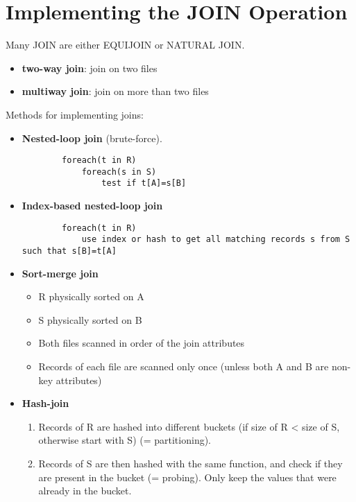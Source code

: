 \section{Implementing the JOIN Operation}
Many JOIN are either EQUIJOIN or NATURAL JOIN.
\begin{itemize}
    \item \textbf{two-way join}: join on two files
    \item \textbf{multiway join}: join on more than two files
\end{itemize}
Methods for implementing joins:
\begin{itemize}
    \item \textbf{Nested-loop join} (brute-force).
    \begin{verbatim}
        foreach(t in R)
            foreach(s in S)
                test if t[A]=s[B]
    \end{verbatim}
    
    \item \textbf{Index-based nested-loop join}
    \begin{verbatim}
        foreach(t in R)
            use index or hash to get all matching records s from S such that s[B]=t[A]
    \end{verbatim}
    
    \item \textbf{Sort-merge join} 
    \begin{itemize}
        \item R physically sorted on A
        \item S physically sorted on B
        \item Both files scanned in order of the join attributes
        \item Records of each file are scanned only once (unless both A and B are non-key attributes)
    \end{itemize}
    
    \item \textbf{Hash-join}
    \begin{enumerate}
        \item Records of R are hashed into different buckets (if size of R < size of S, otherwise start with S) (= partitioning).
        \item Records of S are then hashed with the same function, and check if they are present in the bucket (= probing). Only keep the values that were already in the bucket.
    \end{enumerate}
    
\end{itemize}

